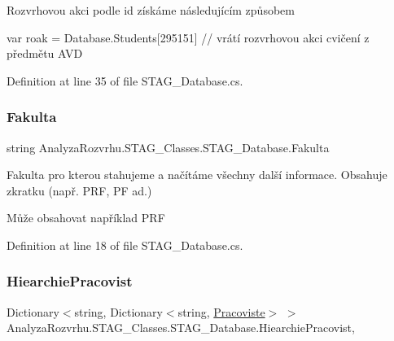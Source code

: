 Rozvrhovou akci podle id získáme následujícím způsobem 
\begin{DoxyCode}
var roak = Database.Students[295151] \textcolor{comment}{// vrátí rozvrhovou akci cvičení z předmětu AVD}
\end{DoxyCode}
 

Definition at line 35 of file S\+T\+A\+G\+\_\+\+Database.\+cs.

\mbox{\label{class_analyza_rozvrhu_1_1_s_t_a_g___classes_1_1_s_t_a_g___database_a69eb11879c56770b1a5f7af80a84df48}} 
\subsubsection{\texorpdfstring{Fakulta}{Fakulta}}
{\footnotesize\ttfamily string Analyza\+Rozvrhu.\+S\+T\+A\+G\+\_\+\+Classes.\+S\+T\+A\+G\+\_\+\+Database.\+Fakulta\hspace{0.3cm}{\ttfamily [get]}}



Fakulta pro kterou stahujeme a načítáme všechny další informace. Obsahuje zkratku (např. P\+RF, PF ad.) 

Může obsahovat například {\ttfamily P\+RF}

Definition at line 18 of file S\+T\+A\+G\+\_\+\+Database.\+cs.

\mbox{\label{class_analyza_rozvrhu_1_1_s_t_a_g___classes_1_1_s_t_a_g___database_a86c85c4d262d6ce81e7da2e8abc3a531}} 
\subsubsection{\texorpdfstring{Hiearchie\+Pracovist}{HiearchiePracovist}}
{\footnotesize\ttfamily Dictionary$<$string, Dictionary$<$string, \hyperlink{class_analyza_rozvrhu_1_1_s_t_a_g___classes_1_1_pracoviste}{Pracoviste}$>$ $>$ Analyza\+Rozvrhu.\+S\+T\+A\+G\+\_\+\+Classes.\+S\+T\+A\+G\+\_\+\+Database.\+Hiearchie\+Pracovist\hspace{0.3cm}{\ttfamily [get]}, {\ttfamily [set]}}



